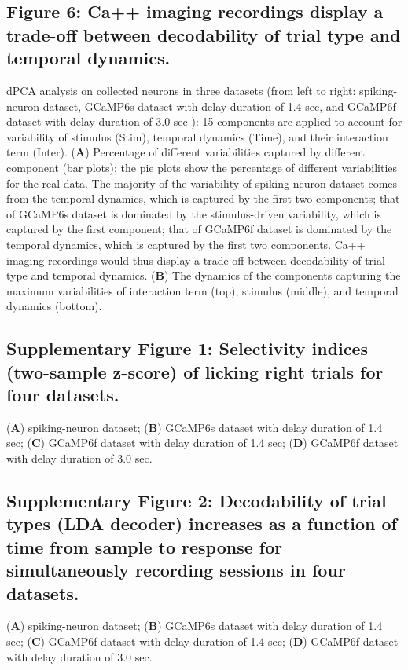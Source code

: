 \documentclass[12pt, oneside]{nature}
\begin{document}
\subsection{Figure 6: Ca++ imaging recordings display a
trade-off between decodability of trial type and temporal dynamics.} 
dPCA analysis on collected neurons in three datasets (from left to right:
spiking-neuron dataset, 
GCaMP6s dataset with delay duration of 1.4 sec,
and GCaMP6f dataset with delay duration of 3.0 sec
): 15 components are applied to account for variability of
stimulus (Stim), temporal dynamics (Time), and their interaction term (Inter).
(\textbf{A}) Percentage of different variabilities captured by different component
(bar plots); the pie plots show the percentage of different variabilities for the
real data. The majority of the variability of spiking-neuron dataset comes from the
temporal dynamics, which is captured by the first two components; that of
GCaMP6s dataset is dominated by the stimulus-driven variability, which is
captured by the first component; that of GCaMP6f dataset is dominated by 
the temporal dynamics, which is captured by the first two components.
Ca++ imaging recordings would thus display a
trade-off between decodability of trial type 
and temporal dynamics.
 (\textbf{B}) The dynamics of the components capturing the maximum
variabilities of interaction term (top), stimulus (middle), and temporal dynamics (bottom).

\subsection{Supplementary Figure 1: Selectivity indices (two-sample
z-score) of licking right trials for four datasets.}
(\textbf{A}) spiking-neuron dataset; 
(\textbf{B}) GCaMP6s dataset with delay duration of 1.4 sec;
(\textbf{C}) GCaMP6f dataset with delay duration of 1.4 sec;
(\textbf{D}) GCaMP6f dataset with delay duration of 3.0 sec.
 

\subsection{Supplementary Figure 2: Decodability of trial types (LDA decoder) increases 
as a function of time from sample to response for 
simultaneously recording sessions in four datasets.} 
(\textbf{A}) spiking-neuron dataset; 
(\textbf{B}) GCaMP6s dataset with delay duration of 1.4 sec;
(\textbf{C}) GCaMP6f dataset with delay duration of 1.4 sec;
(\textbf{D}) GCaMP6f dataset with delay duration of 3.0 sec.
\end{document}
